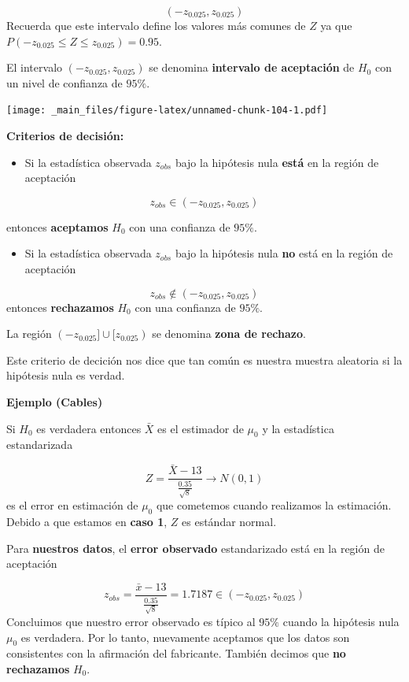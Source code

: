 \documentclass[
]{book}
\providecommand{\tightlist}{%
  \setlength{\itemsep}{0pt}\setlength{\parskip}{0pt}}
\begin{document}
\[(-z_{0.025}, z_{0.025})\]
Recuerda que este intervalo define los valores más comunes de \(Z\) ya que \(P(-z_{0.025} \leq Z \leq z_{0.025})=0.95\).

El intervalo \((-z_{0.025}, z_{0.025})\) se denomina \textbf{intervalo de aceptación} de \(H_0\) con un nivel de confianza de \(95\%\).

\texttt{[image: \_main\_files/figure-latex/unnamed-chunk-104-1.pdf]}

\textbf{Criterios de decisión:}

\begin{itemize}
\tightlist
\item
  Si la estadística observada \(z_{obs}\) bajo la hipótesis nula \textbf{está} en la región de aceptación
\end{itemize}

\[z_{obs} \in (-z_{0.025}, z_{0.025})\]

entonces \textbf{aceptamos} \(H_0\) con una confianza de \(95\%\).

\begin{itemize}
\tightlist
\item
  Si la estadística observada \(z_{obs}\) bajo la hipótesis nula \textbf{no} está en la región de aceptación
\end{itemize}

\[z_{obs} \notin (-z_{0.025}, z_{0.025})\] entonces \textbf{rechazamos} \(H_0\) con una confianza de \(95\%\).

La región \((-z_{0.025}] \cup[z_{0.025})\) se denomina \textbf{zona de rechazo}.

Este criterio de decición nos dice que tan común es nuestra muestra aleatoria si la hipótesis nula es verdad.

\textbf{Ejemplo (Cables)}

Si \(H_0\) es verdadera entonces \(\bar{X}\) es el estimador de \(\mu_0\) y la estadística estandarizada

\[Z=\frac{\bar{X}-13}{\frac{0.35}{\sqrt{8}}} \rightarrow N(0,1)\]
es el error en estimación de \(\mu_0\) que cometemos cuando realizamos la estimación. Debido a que estamos en \textbf{caso 1}, \(Z\) es estándar normal.

Para \textbf{nuestros datos}, el \textbf{error observado} estandarizado está en la región de aceptación

\[z_{obs}=\frac{\bar{x}-13}{\frac{0.35}{\sqrt{8}}}=1.7187 \in (-z_{0.025}, z_{0.025})\]
Concluimos que nuestro error observado es típico al \(95\%\) cuando la hipótesis nula \(\mu_0\) es verdadera. Por lo tanto, nuevamente aceptamos que los datos son consistentes con la afirmación del fabricante. También decimos que \textbf{no rechazamos} \(H_0\).
\end{document}

